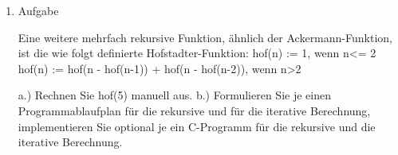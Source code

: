 \documentclass[12pt,a4paper]{scrreprt}
\begin{document}
\begin{enumerate}
\begin{comment}
\end{comment}

\item Aufgabe %

Eine weitere mehrfach rekursive Funktion, ähnlich der Ackermann-Funktion, ist die wie folgt definierte Hofstadter-Funktion:
hof(n) := 1, wenn n<= 2
hof(n) := hof(n - hof(n-1)) + hof(n - hof(n-2)), wenn n>2

a.) Rechnen Sie hof(5) manuell aus.
b.) Formulieren Sie je einen Programmablaufplan für die rekursive und für die iterative Berechnung, implementieren Sie optional je ein C-Programm für die rekursive und die iterative Berechnung.

\end{enumerate}
\end{document}
